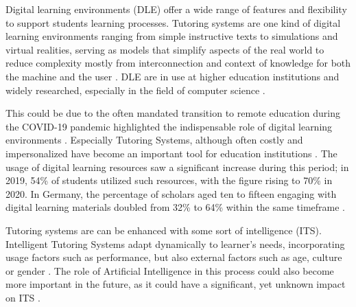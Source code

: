 
Digital learning environments (DLE) offer a wide range of features and flexibility to support students learning processes. Tutoring systems are one kind of digital learning environments ranging from simple instructive texts to simulations and virtual realities, serving as models that simplify aspects of the real world to reduce complexity mostly from interconnection and context of knowledge for both the machine and the user \parencite{psotkaIntelligentTutoringSystems1988}.
DLE are in use at higher education institutions and widely researched, especially in the field of computer science \parencite{zawacki-richterSystematicReviewResearch2019}.

This could be due to the often mandated transition to remote education during the COVID-19 pandemic highlighted the indispensable role of digital learning environments \parencite{garcia-moralesTransformationHigherEducation2021}.
Especially Tutoring Systems, although often costly and impersonalized have become an important tool for education institutions \parencite{elhadbiReviewStudyAdaptive2024}.
The usage of digital learning resources saw a significant increase during this period; in 2019, 54\% of students utilized such resources, with the figure rising to 70\% in 2020.
In Germany, the percentage of scholars aged ten to fifteen engaging with digital learning materials doubled from 32\% to 64\% within the same timeframe \parencite{statistischesbundesamtsDigitalesLernenNimmt2020}.

Tutoring systems are can be enhanced with some sort of intelligence (ITS). Intelligent Tutoring Systems adapt dynamically to learner's needs, incorporating usage factors such as performance, but also external factors such as age, culture or gender \parencite{nkambouAdvancesIntelligentTutoring2010, gonzalezGamificationIntelligentTutoring2014}.
The role of Artificial Intelligence in this process could also become more important in the future, as it could have a significant, yet unknown impact on ITS \parencite{zawacki-richterSystematicReviewResearch2019}.

